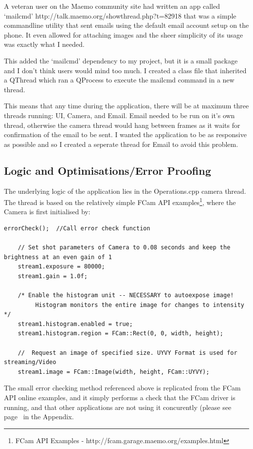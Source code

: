 A veteran user on the Maemo community site had written an app called ‘mailcmd’ http://talk.maemo.org/showthread.php?t=82918 that was a simple commandline utility that sent emails using the default email account setup on the phone. It even allowed for attaching images and the sheer simplicity of its usage was exactly what I needed.

This added the ‘mailcmd’ dependency to my project, but it is a small package and I don’t think users would mind too much. I created a class file that inherited a QThread which ran a QProcess to execute the mailcmd command in a new thread.

This means that any time during the application, there will be at maximum three threads running: UI, Camera, and Email. Email needed to be run on it’s own thread, otherwise the camera thread would hang between frames as it waits for confirmation of the email to be sent. I wanted the application to be as responsive as possible and so I created a seperate thread for Email to avoid this problem.

\subsection{Logic and Optimisations/Error Proofing}
The underlying logic of the application lies in the Operations.cpp camera thread. The thread is based on the relatively simple FCam API examples\footnote{FCam API Examples - http://fcam.garage.maemo.org/examples.html}, where the Camera is first initialised by:
\begin{lstlisting}[title=\bf Snippet initialise() function in Operations.cpp]
     errorCheck();  //Call error check function

    // Set shot parameters of Camera to 0.08 seconds and keep the brightness at an even gain of 1
    stream1.exposure = 80000;
    stream1.gain = 1.0f;

    /* Enable the histogram unit -- NECESSARY to autoexpose image!
         Histogram monitors the entire image for changes to intensity */
    stream1.histogram.enabled = true;
    stream1.histogram.region = FCam::Rect(0, 0, width, height); 

    //  Request an image of specified size. UYVY Format is used for streaming/Video
    stream1.image = FCam::Image(width, height, FCam::UYVY);
\end{lstlisting}
The small error checking method referenced above is replicated from the FCam API online examples, and it simply performs a check that the FCam driver is running, and that other applications are not using it concurently (please see page~\pageref{operations} in the Appendix.


